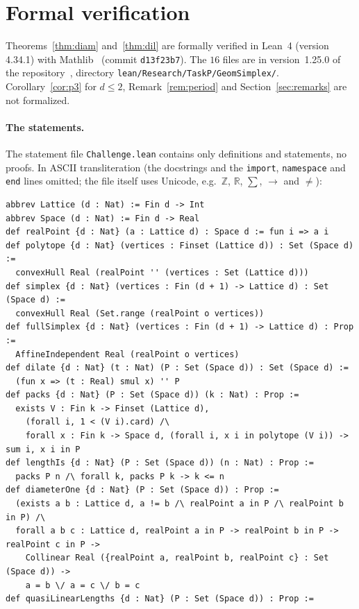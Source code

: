 \documentclass[11pt]{article}
\theoremstyle{definition}
\theoremstyle{remark}
\newcommand{\repoversion}{1.25.0}
\begin{document}
{\sloppy
\section{Formal verification}\label{sec:lean}

Theorems~\ref{thm:diam} and~\ref{thm:dil} are formally verified in Lean~4
(version 4.34.1) with Mathlib~\cite{mathlib} (commit \texttt{d13f23b7}). The
$16$ files are in version~\repoversion{} of the repository~\cite{repo},
directory \texttt{lean/Research/TaskP/GeomSimplex/}. Corollary~\ref{cor:p3}
for $d\le2$, Remark~\ref{rem:period} and Section~\ref{sec:remarks} are not
formalized.

\paragraph{The statements.}
The statement file \texttt{Challenge.lean} contains only definitions and
statements, no proofs. In ASCII transliteration (the docstrings and the
\texttt{import}, \texttt{namespace} and \texttt{end} lines omitted; the file
itself uses Unicode, e.g.\ $\mathbb Z$, $\mathbb R$, $\sum$, $\to$ and $\ne$):
{\footnotesize
\begin{verbatim}
abbrev Lattice (d : Nat) := Fin d -> Int
abbrev Space (d : Nat) := Fin d -> Real
def realPoint {d : Nat} (a : Lattice d) : Space d := fun i => a i
def polytope {d : Nat} (vertices : Finset (Lattice d)) : Set (Space d) :=
  convexHull Real (realPoint '' (vertices : Set (Lattice d)))
def simplex {d : Nat} (vertices : Fin (d + 1) -> Lattice d) : Set (Space d) :=
  convexHull Real (Set.range (realPoint o vertices))
def fullSimplex {d : Nat} (vertices : Fin (d + 1) -> Lattice d) : Prop :=
  AffineIndependent Real (realPoint o vertices)
def dilate {d : Nat} (t : Nat) (P : Set (Space d)) : Set (Space d) :=
  (fun x => (t : Real) smul x) '' P
def packs {d : Nat} (P : Set (Space d)) (k : Nat) : Prop :=
  exists V : Fin k -> Finset (Lattice d),
    (forall i, 1 < (V i).card) /\
    forall x : Fin k -> Space d, (forall i, x i in polytope (V i)) -> sum i, x i in P
def lengthIs {d : Nat} (P : Set (Space d)) (n : Nat) : Prop :=
  packs P n /\ forall k, packs P k -> k <= n
def diameterOne {d : Nat} (P : Set (Space d)) : Prop :=
  (exists a b : Lattice d, a != b /\ realPoint a in P /\ realPoint b in P) /\
  forall a b c : Lattice d, realPoint a in P -> realPoint b in P -> realPoint c in P ->
    Collinear Real ({realPoint a, realPoint b, realPoint c} : Set (Space d)) ->
    a = b \/ a = c \/ b = c
def quasiLinearLengths {d : Nat} (P : Set (Space d)) : Prop :=

\end{verbatim}}}
\end{document}
